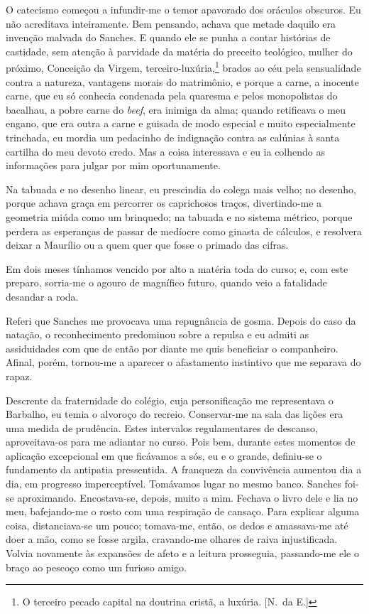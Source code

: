 O catecismo começou a infundir{}-me o temor apavorado dos
oráculos obscuros. Eu não acreditava inteiramente. Bem pensando, achava
que metade daquilo era invenção malvada do Sanches. E quando ele se
punha a contar histórias de castidade, sem atenção à parvidade da
matéria do preceito teológico, mulher do próximo, Conceição da Virgem, 
terceiro{}-luxúria,\footnote{ O terceiro pecado capital na doutrina cristã, a luxúria. 
[N.~da E.]} brados ao céu pela sensualidade contra a natureza, vantagens morais do
matrimônio, e porque a carne, a inocente carne, que eu só conhecia
condenada pela quaresma e pelos monopolistas do bacalhau, a pobre carne
do \textit{beef}, era inimiga da alma; quando retificava o meu engano, que era
outra a carne e guisada de modo especial e muito especialmente
trinchada, eu mordia um pedacinho de indignação contra as calúnias à
santa cartilha do meu devoto credo. Mas a coisa interessava e eu ia
colhendo as informações para julgar por mim oportunamente. 

Na tabuada e no desenho linear, eu prescindia do colega mais velho; no desenho,
porque achava graça em percorrer os caprichosos traços, divertindo{}-me
a geometria miúda como um brinquedo; na tabuada e no sistema métrico,
porque perdera as esperanças de passar de medíocre como ginasta de
cálculos, e resolvera deixar a Maurílio ou a quem quer que fosse o
primado das cifras. 

Em dois meses tínhamos vencido por alto a matéria
toda do curso; e, com este preparo, sorria{}-me o agouro de magnífico
futuro, quando veio a fatalidade desandar a roda. 

Referi que Sanches me provocava uma repugnância de gosma. Depois do caso da 
natação, o reconhecimento predominou sobre a repulsa e eu admiti as assiduidades
com que de então por diante me quis beneficiar o companheiro. Afinal,
porém, tornou{}-me a aparecer o afastamento instintivo que me separava do rapaz. 

Descrente da fraternidade do colégio, cuja personificação me
representava o Barbalho, eu temia o alvoroço do recreio. Conservar{}-me
na sala das lições era uma medida de prudência. Estes intervalos
regulamentares de descanso, aproveitava{}-os para me adiantar no curso.
Pois bem, durante estes momentos de aplicação excepcional em que
ficávamos a sós, eu e o grande, definiu{}-se o fundamento da antipatia
pressentida. A franqueza da convivência aumentou dia a dia, em
progresso imperceptível. Tomávamos lugar no mesmo banco. Sanches
foi{}-se aproximando. Encostava{}-se, depois, muito a mim. Fechava o
livro dele e lia no meu, bafejando{}-me o rosto com uma respiração de
cansaço. Para explicar alguma coisa, distanciava{}-se um pouco;
tomava{}-me, então, os dedos e amassava{}-me até doer a mão, como se
fosse argila, cravando{}-me olhares de raiva injustificada. Volvia
novamente às expansões de afeto e a leitura prosseguia, passando{}-me
ele o braço ao pescoço como um furioso amigo. 

